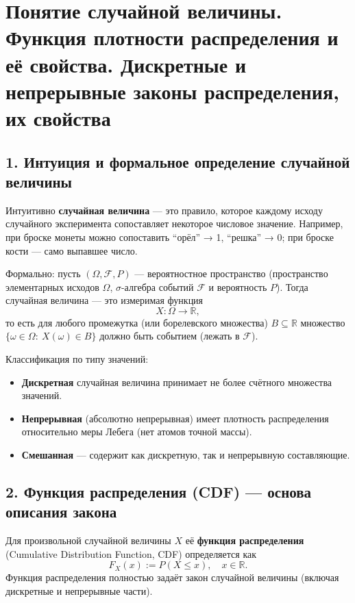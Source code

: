 \section{Понятие случайной величины. Функция плотности распределения и её свойства. Дискретные и непрерывные законы распределения, их свойства}

\subsection*{1. Интуиция и формальное определение случайной величины}

Интуитивно \textbf{случайная величина} — это правило, которое каждому исходу случайного эксперимента сопоставляет некоторое числовое значение. Например, при броске монеты можно сопоставить ``орёл'' → 1, ``решка'' → 0; при броске кости — само выпавшее число.

Формально: пусть $(\Omega,\mathcal{F},P)$ — вероятностное пространство (пространство элементарных исходов $\Omega$, $\sigma$-алгебра событий $\mathcal{F}$ и вероятность $P$). Тогда случайная величина — это измеримая функция
\[
X:\Omega\to\mathbb{R},
\]
то есть для любого промежутка (или борелевского множества) $B\subseteq\mathbb{R}$ множество $\{\omega\in\Omega:\ X(\omega)\in B\}$ должно быть событием (лежать в $\mathcal{F}$).

\medskip
Классификация по типу значений:
\begin{itemize}
  \item \textbf{Дискретная} случайная величина принимает не более счётного множества значений.
  \item \textbf{Непрерывная} (абсолютно непрерывная) имеет плотность распределения относительно меры Лебега (нет атомов точной массы).
  \item \textbf{Смешанная} — содержит как дискретную, так и непрерывную составляющие.
\end{itemize}

\subsection*{2. Функция распределения (CDF) — основа описания закона}

Для произвольной случайной величины $X$ её \textbf{функция распределения} (Cumulative Distribution Function, CDF) определяется как
\[
F_X(x) := P(X \le x),\quad x\in\mathbb{R}.
\]
Функция распределения полностью задаёт закон случайной величины (включая дискретные и непрерывные части).


